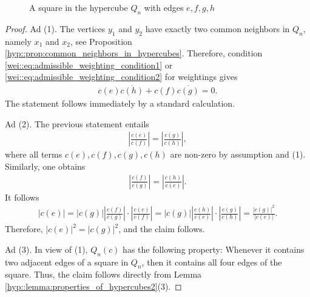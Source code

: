\documentclass[a4paper]{amsart}
\begin{document}
    \begin{figure}[ht]
        \label{reps::fig:square_with_edges_efgh}
        \caption{A square in the hypercube $Q_n$ with edges $e, f, g, h$}
    \end{figure}

\begin{proof}
    Ad (1). The vertices $y_1$ and $y_2$ have exactly two common neighbors in $Q_n$, namely $x_1$ and $x_2$, see Proposition \ref{hyp::prop:common_neighbors_in_hypercubes}. Therefore, condition \eqref{wei::eq:admissible_weighting_condition1} or \eqref{wei::eq:admissible_weighting_condition2} for weightings gives
    \begin{align*}
        c(e) \overline{c(h)} + c(f) \overline{c(g)} = 0.
    \end{align*}
    The statement follows immediately by a standard calculation.

    Ad (2). The previous statement entails
    \begin{align*}
        \left| \frac{c(e)}{c(f)} \right| = \left| \frac{c(g)}{c(h)} \right|,
    \end{align*}
    where all terms $c(e), c(f), c(g), c(h)$ are non-zero by assumption and (1). Similarly, one obtains
    \begin{align*}
        \left| \frac{c(f)}{c(g)} \right| = \left| \frac{c(h)}{c(e)} \right|.
    \end{align*}
    It follows
    \begin{align*}
        |c(e)| 
            = |c(g)| \left| \frac{c(f)}{c(g)} \right| \cdot \left| \frac{c(e)}{c(f)} \right|
            = |c(g)| \left| \frac{c(h)}{c(e)} \right| \cdot \left| \frac{c(g)}{c(h)} \right|
            = \frac{|c(g)|^2}{|c(e)|}.
    \end{align*}
    Therefore, $|c(e)|^2 = |c(g)|^2$, and the claim follows.

    Ad (3). In view of (1), $Q_n(c)$ has the following property: Whenever it contains two adjacent edges of a square in $Q_n$, then it contains all four edges of the square. Thus, the claim follows directly from Lemma \ref{hyp::lemma:properties_of_hypercubes2}(3).
\end{proof}
\end{document}

